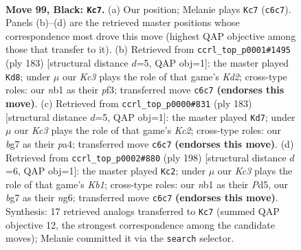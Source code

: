 \documentclass[11pt]{article}
\begin{document}
\clearpage

\begin{figure}[p]\centering
\begin{subfigure}{0.46\textwidth}\centering
\resizebox{\linewidth}{!}{%
\newchessgame
\chessboard[
  setfen={8/6B1/2k5/8/p1p3b1/8/5K2/1N6 b - - 53 99},
  showmover=false,
  pgfstyle=straightmove, color=movearrow, markmove={c6-c7}
]}
\caption{}
\end{subfigure}\hfill
\begin{subfigure}{0.46\textwidth}\centering
\resizebox{\linewidth}{!}{%
\newchessgame
\chessboard[
  setfen={8/b2k4/8/4p3/8/5P2/8/1B2K3 b - - 6 92},
  showmover=false,
  pgfstyle=straightmove, color=movearrow, markmove={d7-d8}
]}
\caption{}
\end{subfigure}
\\[4pt]
\begin{subfigure}{0.46\textwidth}\centering
\resizebox{\linewidth}{!}{%
\newchessgame
\chessboard[
  setfen={8/2k5/8/p2K4/P7/8/2N1p3/8 b - - 51 92},
  showmover=false,
  pgfstyle=straightmove, color=movearrow, markmove={c7-d7}
]}
\caption{}
\end{subfigure}\hfill
\begin{subfigure}{0.46\textwidth}\centering
\resizebox{\linewidth}{!}{%
\newchessgame
\chessboard[
  setfen={8/3B4/3p2n1/3P4/1k6/8/8/1K6 w - - 13 100},
  showmover=false,
  pgfstyle=straightmove, color=movearrow, markmove={b1-c2}
]}
\caption{}
\end{subfigure}
\caption{\textbf{Move 99, Black: \texttt{Kc7}.} (a) Our position; Melanie plays \texttt{Kc7} (\texttt{c6c7}). Panels (b)--(d) are the retrieved master positions whose correspondence most drove this move (highest QAP objective among those that transfer to it). (b) Retrieved from \texttt{ccrl\_top\_p0001\#1495} (ply 183) [structural distance $d$=5, QAP obj=1]: the master played \texttt{Kd8}; under $\mu$ our \emph{Kc3} plays the role of that game's \emph{Kd2}; cross-type roles: our \emph{n}b1 as their \emph{p}f3; transferred move \texttt{c6c7} \textbf{(endorses this move)}. (c) Retrieved from \texttt{ccrl\_top\_p0000\#831} (ply 183) [structural distance $d$=5, QAP obj=1]: the master played \texttt{Kd7}; under $\mu$ our \emph{Kc3} plays the role of that game's \emph{Kc2}; cross-type roles: our \emph{b}g7 as their \emph{p}a4; transferred move \texttt{c6c7} \textbf{(endorses this move)}. (d) Retrieved from \texttt{ccrl\_top\_p0002\#880} (ply 198) [structural distance $d$=6, QAP obj=1]: the master played \texttt{Kc2}; under $\mu$ our \emph{Kc3} plays the role of that game's \emph{Kb1}; cross-type roles: our \emph{n}b1 as their \emph{P}d5, our \emph{b}g7 as their \emph{n}g6; transferred move \texttt{c6c7} \textbf{(endorses this move)}. Synthesis: 17 retrieved analogs transferred to \texttt{Kc7} (summed QAP objective 12, the strongest correspondence among the candidate moves); Melanie committed it via the \texttt{search} selector.}
\label{fig:thought-m197}
\end{figure}
\end{document}
